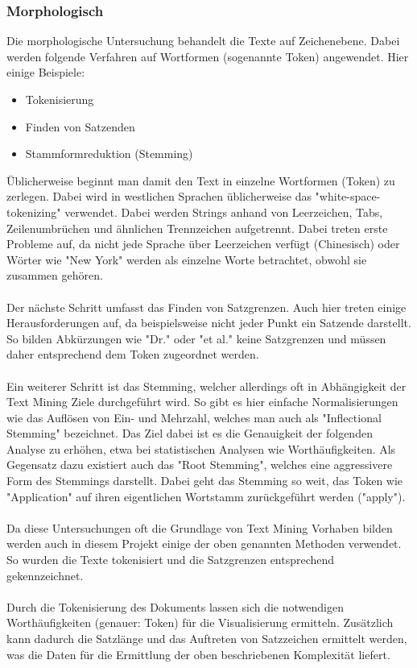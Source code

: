 \subsubsection{Morphologisch}
Die morphologische Untersuchung behandelt die Texte auf Zeichenebene. Dabei werden folgende Verfahren auf Wortformen (sogenannte Token) angewendet. Hier einige Beispiele:\\
\begin{itemize}
	\item Tokenisierung
	\item Finden von Satzenden
	\item Stammformreduktion (Stemming)
\end{itemize}
\"Ublicherweise beginnt man damit den Text in einzelne Wortformen (Token) zu zerlegen. Dabei wird in westlichen Sprachen \"ublicherweise das "white-space-tokenizing" verwendet. Dabei werden Strings anhand von Leerzeichen, Tabs, Zeilenumbr\"uchen und \"ahnlichen Trennzeichen aufgetrennt. Dabei treten erste Probleme auf, da nicht jede Sprache \"uber Leerzeichen verf\"ugt (Chinesisch) oder W\"orter wie "New York" werden als einzelne Worte betrachtet, obwohl sie zusammen geh\"oren.\\
\\
Der n\"achste Schritt umfasst das Finden von Satzgrenzen. Auch hier treten einige Herausforderungen auf, da beispielsweise nicht jeder Punkt ein Satzende darstellt. So bilden Abk\"urzungen wie "Dr." oder "et al." keine Satzgrenzen und m\"ussen daher entsprechend dem Token zugeordnet werden.\\
\\
Ein weiterer Schritt ist das Stemming, welcher allerdings oft in Abh\"angigkeit der Text Mining Ziele durchgef\"uhrt wird. So gibt es hier einfache Normalisierungen wie das Aufl\"osen von Ein- und Mehrzahl, welches man auch als "Inflectional Stemming" bezeichnet. Das Ziel dabei ist es die Genauigkeit der folgenden Analyse zu erh\"ohen, etwa bei statistischen Analysen wie Worth\"aufigkeiten. Als Gegensatz dazu existiert auch das "Root Stemming", welches eine aggressivere Form des Stemmings darstellt. Dabei geht das Stemming so weit, das Token wie "Application" auf ihren eigentlichen Wortstamm zur\"uckgef\"uhrt werden ("apply").\\
\\
Da diese Untersuchungen oft die Grundlage von Text Mining Vorhaben bilden werden auch in diesem Projekt einige der oben genannten Methoden verwendet. So wurden die Texte tokenisiert und die Satzgrenzen entsprechend gekennzeichnet. \\
\\
Durch die Tokenisierung des Dokuments lassen sich die notwendigen Worth\"aufigkeiten (genauer: Token)  f\"ur die Visualisierung ermitteln. Zus\"atzlich kann dadurch die Satzl\"ange und das Auftreten von Satzzeichen ermittelt werden, was die Daten f\"ur die Ermittlung der oben beschriebenen Komplexit\"at liefert.

